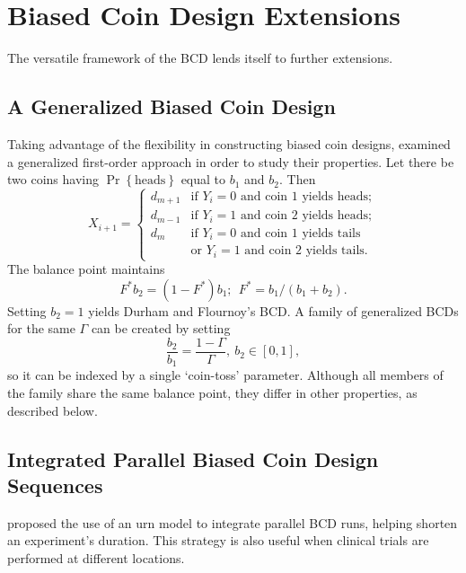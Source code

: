 \section{Biased Coin Design Extensions}

The versatile framework of the BCD lends itself to further extensions.

\subsection{A Generalized Biased Coin Design}
Taking advantage of the flexibility in constructing biased coin designs, \cite{Bort:Giov:Upan:2005} examined a generalized first-order approach in order to study their properties. Let there be two coins having $\Pr\left\{\textrm{heads}\right\}$ equal to $b_1$ and $b_2$. Then
\begin{equation}\label{eq:BortotCombo}
X_{i+1}=
\begin{cases}
d_{m+1} &\textrm{if $Y_i=0$ and coin 1 yields heads};\\
d_{m-1} &\textrm{if $Y_i=1$ and coin 2 yields heads};\\
d_{m} &\textrm{if $Y_i=0$ and coin 1 yields tails}\\
        & \textrm{or $Y_i=1$ and coin 2 yields tails.}
\end{cases}
\end{equation}
\noindent The balance point maintains
\begin{equation*}
F^*b_2=\left(1-F^*\right)b_1;\ \ F^*=b_1/(b_1+b_2).
\end{equation*}
\noindent Setting $b_2=1$ yields Durham and Flournoy's BCD. A family of generalized BCDs for the same $\Gamma$ can be created by setting $$\frac{b_2}{b_1}=\frac{1-\Gamma}{\Gamma},\ b_2\in [0,1],$$ so it can be indexed by a single `coin-toss' parameter. Although all members of the family share the same balance point, they differ in other properties, as described below.

\subsection{Integrated Parallel Biased Coin Design Sequences}
\cite{Flou:aran:1998} proposed the use of an urn model to integrate parallel BCD runs, helping shorten an experiment's duration. This strategy is also useful when clinical trials are performed at different locations.

